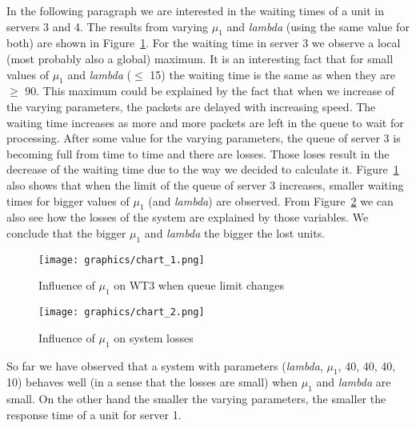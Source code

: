\documentclass[12pt]{article}
\theoremstyle{plain}
\begin{document}
In the following paragraph we are interested in the waiting times of a unit in
servers 3 and 4. The results from varying $\mu_1$ and \emph{lambda} (using the 
same value for both) are shown in
Figure~\ref{fig:influence_of_mu1_on_wt3_when_queue_limit_changes}. For the
waiting time in server 3 we observe a local (most probably also a global)
maximum. It is an interesting fact that for small values of $\mu_1$ and
\emph{lambda} ($\le$ 15) the waiting time is the same as when they are $\ge$
90. This maximum could be explained by the fact that when we increase of the
varying parameters, the packets are delayed with increasing speed. The waiting
time increases as more and more packets are left in the queue to wait for
processing. After some value for the varying parameters, the queue of server 3
is becoming full from time to time and there are losses. Those loses result in
the decrease of the waiting time due to the way we decided to calculate it.
Figure~\ref{fig:influence_of_mu1_on_wt3_when_queue_limit_changes} also shows
that when the limit of the queue of server 3 increases, smaller waiting times 
for bigger values of $\mu_1$ (and \emph{lambda}) are observed. From
Figure~\ref{fig:influence_of_mu1_on_system:losses} we can also see how the
losses of the system are explained by those variables. We conclude that the
bigger $\mu_1$ and \emph{lambda} the bigger the lost units.  

\begin{figure}
  \caption{Influence of $\mu_1$ on WT3 when queue limit changes}
  \texttt{[image: graphics/chart\_1.png]}
  \label{fig:influence_of_mu1_on_wt3_when_queue_limit_changes}
\end{figure}
\begin{figure}
  \caption{Influence of $\mu_1$ on system losses}
  \texttt{[image: graphics/chart\_2.png]}
  \label{fig:influence_of_mu1_on_system:losses}
\end{figure}

So far we have observed that a system with parameters (\emph{lambda}, $\mu_1$,
40, 40, 40, 10) behaves well (in a sense that the losses are small) when
$\mu_1$ and \emph{lambda} are small. On the other hand the smaller the varying
parameters, the smaller the response time of a unit for server 1.
\end{document}
